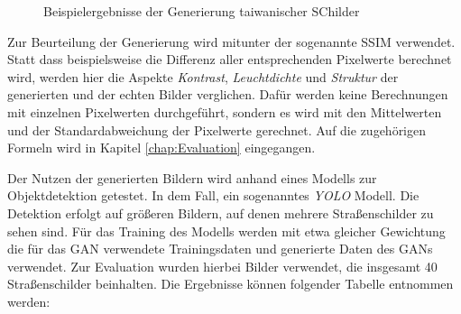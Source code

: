 \begin{figure}[H]
\begin{subfigure}{0.125\textwidth}
    \end{subfigure}
       \caption{Beispielergebnisse der Generierung taiwanischer SChilder \cite{taiwanGAN}}
       \label{fig:taiwan-gen-schilder}
 \end{figure}

Zur Beurteilung der Generierung wird mitunter der sogenannte \ac{SSIM} verwendet. Statt dass beispielsweise die Differenz aller entsprechenden Pixelwerte berechnet wird, werden hier die Aspekte \emph{Kontrast}, \emph{Leuchtdichte} und \emph{Struktur} der generierten und der echten Bilder verglichen. Dafür werden keine Berechnungen mit einzelnen Pixelwerten durchgeführt, sondern es wird mit den Mittelwerten und der Standardabweichung der Pixelwerte gerechnet. Auf die zugehörigen Formeln wird in Kapitel \ref{chap:Evaluation} eingegangen. \cite{taiwanGAN}

Der Nutzen der generierten Bildern wird anhand eines Modells zur Objektdetektion getestet. In dem Fall, ein sogenanntes \emph{YOLO} Modell. Die Detektion erfolgt auf größeren Bildern, auf denen mehrere Straßenschilder zu sehen sind. Für das Training des Modells werden mit etwa gleicher Gewichtung die für das \ac{GAN} verwendete Trainingsdaten und generierte Daten des \acp{GAN} verwendet. Zur Evaluation wurden hierbei Bilder verwendet, die insgesamt 40 Straßenschilder beinhalten. Die Ergebnisse können folgender Tabelle entnommen werden: \cite{taiwanGAN}

